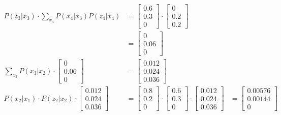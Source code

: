 \documentclass[answers]{exam}
\begin{document}
\begin{questions}
\begin{parts}
\begin{solution}
\begin{align*}
                P(z_3 | x_3) \cdot \sum_{x_4} P(x_4 | x_3) P(z_4 | x_4) &= \begin{bmatrix}
                    0.6 \\
                    0.3 \\
                    0
                \end{bmatrix} \cdot \begin{bmatrix} 0 \\ 0.2 \\ 0.2 \end{bmatrix} \\ &= \begin{bmatrix} 0 \\ 0.06 \\ 0 \end{bmatrix} \\
                \sum_{x_3} P(x_3 | x_2) \cdot \begin{bmatrix} 0 \\ 0.06 \\ 0 \end{bmatrix} &= \begin{bmatrix} 0.012 \\ 0.024 \\ 0.036 \end{bmatrix} \\   
                P(x_{2} | x_1) \cdot P(z_{2} | x_2) \cdot \begin{bmatrix} 0.012 \\ 0.024 \\ 0.036 \end{bmatrix} &= \begin{bmatrix} 0.8 \\ 0.2 \\ 0 \end{bmatrix} \cdot \begin{bmatrix} 0.6 \\ 0.3 \\ 0 \end{bmatrix} \cdot \begin{bmatrix} 0.012 \\ 0.024 \\ 0.036 \end{bmatrix} &= \begin{bmatrix} 0.00576 \\ 0.00144 \\ 0 \end{bmatrix} \\
            \end{align*}


\end{solution}
\end{parts}
\end{questions}
\end{document}
